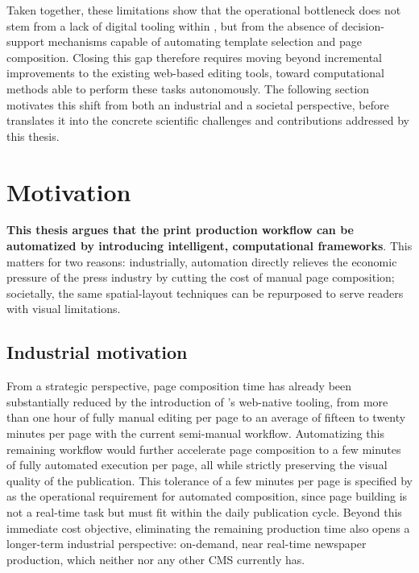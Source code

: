 Taken together, these limitations show that the operational bottleneck does not stem from a lack of digital tooling within \melody, but from the absence of decision-support mechanisms capable of automating template selection and page composition. Closing this gap therefore requires moving beyond incremental improvements to the existing web-based editing tools, toward computational methods able to perform these tasks autonomously. The following section motivates this shift from both an industrial and a societal perspective, before  translates it into the concrete scientific challenges and contributions addressed by this thesis.

\section{Motivation}
\label{sec:motivation}

\textbf{This thesis argues that the print production workflow can be automatized  by introducing intelligent, computational frameworks}. This matters for two reasons: industrially, automation directly relieves the economic pressure of the press industry by cutting the cost of manual page composition; societally, the same spatial-layout techniques can be repurposed to serve readers with visual limitations.

\subsection{Industrial motivation}
\label{sec:industrial-motivation}

From a strategic perspective, page composition time has already been substantially reduced by the introduction of \melody's web-native tooling, from more than one hour of fully manual editing per page to an average of fifteen to twenty minutes per page with the current semi-manual workflow. Automatizing this remaining workflow would further accelerate page composition to a few minutes of fully automated execution per page, all while strictly preserving the visual quality of the publication. This tolerance of a few minutes per page is specified by \melody as the operational requirement for automated composition, since page building is not a real-time task but must fit within the daily publication cycle. Beyond this immediate cost objective, eliminating the remaining production time also opens a longer-term industrial perspective: on-demand, near real-time newspaper production, which neither \melody nor any other CMS currently has.

